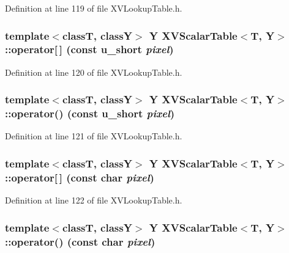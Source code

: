 Definition at line 119 of file XVLookup\-Table.h.\label{XVScalarTable_a4}
\hypertarget{class_XVScalarTable_a4}{
\subsubsection[operator{}]{\setlength{\rightskip}{0pt plus 5cm}template$<$classT, classY$>$ Y XVScalar\-Table$<$T, Y$>$::operator\mbox{[}$\,$\mbox{]} (const u\_\-short {\em pixel})}}




Definition at line 120 of file XVLookup\-Table.h.\label{XVScalarTable_a5}
\hypertarget{class_XVScalarTable_a5}{
\subsubsection[operator()]{\setlength{\rightskip}{0pt plus 5cm}template$<$classT, classY$>$ Y XVScalar\-Table$<$T, Y$>$::operator() (const u\_\-short {\em pixel})}}




Definition at line 121 of file XVLookup\-Table.h.\label{XVScalarTable_a6}
\hypertarget{class_XVScalarTable_a6}{
\subsubsection[operator{}]{\setlength{\rightskip}{0pt plus 5cm}template$<$classT, classY$>$ Y XVScalar\-Table$<$T, Y$>$::operator\mbox{[}$\,$\mbox{]} (const char {\em pixel})}}




Definition at line 122 of file XVLookup\-Table.h.\label{XVScalarTable_a7}
\hypertarget{class_XVScalarTable_a7}{
\subsubsection[operator()]{\setlength{\rightskip}{0pt plus 5cm}template$<$classT, classY$>$ Y XVScalar\-Table$<$T, Y$>$::operator() (const char {\em pixel})}}




